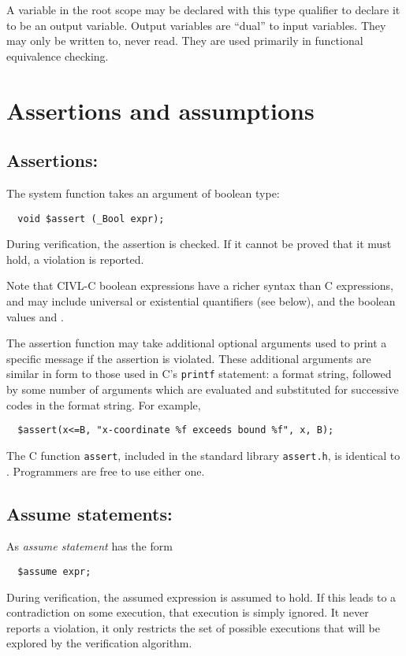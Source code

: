 A variable in the root scope may be declared with this type qualifier
to declare it to be an output variable.  Output variables are ``dual''
to input variables.  They may only be written to, never read.  They
are used primarily in functional equivalence checking.

\section{Assertions and assumptions}

\subsection{Assertions: \cassert}

The system function \cassert{} takes an argument of boolean type:
\begin{verbatim}
  void $assert (_Bool expr);
\end{verbatim}
During verification, the assertion is checked.  If it cannot be proved
that it must hold, a violation is reported.

Note that CIVL-C boolean expressions have a richer syntax than C
expressions, and may include universal or existential quantifiers
(see below), and the boolean values  \ctrue{} and \cfalse{}.

The assertion function may take additional optional arguments used to
print a specific message if the assertion is violated.  These
additional arguments are similar in form to those used in C's
\texttt{printf} statement: a format string, followed by some number of
arguments which are evaluated and substituted for successive codes in
the format string.  For example,
\begin{verbatim}
  $assert(x<=B, "x-coordinate %f exceeds bound %f", x, B); 
\end{verbatim}

The C function \texttt{assert}, included in the standard library
\texttt{assert.h}, is identical to \cassert.  Programmers are
free to use either one.


\subsection{Assume statements: \cassume}

As \emph{assume statement} has the form
\begin{verbatim}
  $assume expr;
\end{verbatim}
During verification, the assumed expression is assumed to hold.  If
this leads to a contradiction on some execution, that execution is
simply ignored.  It never reports a violation, it only restricts the
set of possible executions that will be explored by the verification
algorithm.

